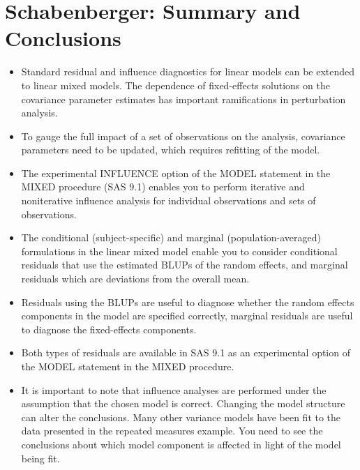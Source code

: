 \documentclass[12pt, a4paper]{report}
\theoremstyle{plain}
\theoremstyle{definition}
\theoremstyle{remark}
\begin{document}
\section{Schabenberger: Summary and Conclusions}
\begin{itemize}
	\item Standard residual and inﬂuence diagnostics for linear models can be extended to linear mixed models. The dependence of ﬁxed-effects solutions on the covariance parameter estimates has important ramiﬁcations in perturbation analysis. 
	\item To gauge the full impact of a set of observations on the analysis, covariance parameters need to be updated, which requires reﬁtting of the model. 
	\item The experimental INFLUENCE option of the MODEL statement in the MIXED procedure (SAS 9.1) enables you to perform iterative and noniterative inﬂuence analysis for individual observations and sets of observations.
	
	\item The conditional (subject-speciﬁc) and marginal (population-averaged) formulations in the linear mixed model enable you to consider conditional residuals that use the estimated BLUPs of the random effects, and marginal residuals which are deviations from the overall mean. 
	\item Residuals using the BLUPs are useful to diagnose whether the random effects components in the model are speciﬁed correctly, marginal residuals are useful to diagnose the ﬁxed-effects components. 
	\item Both types of residuals are available in SAS 9.1 as an experimental option of the MODEL statement in the MIXED procedure.
	
	\item It is important to note that influence analyses are performed under the assumption that the chosen model is correct. Changing the model structure can alter the conclusions. Many other variance models have been ﬁt to the data presented in the repeated measures example. You need to see the conclusions about which model component is affected in light of the model being fit.
\end{itemize}
\end{document}
